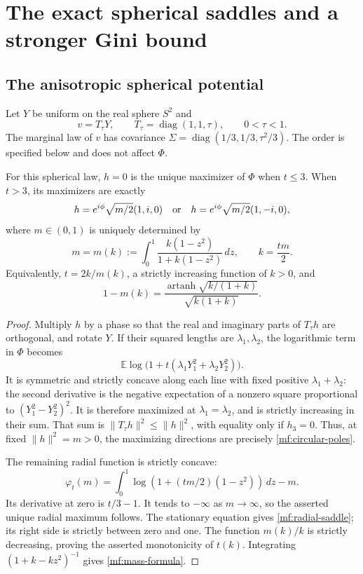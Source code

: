 \section{The exact spherical saddles and a stronger Gini bound}\label{mf:sphere}

\subsection{The anisotropic spherical potential}

Let \(Y\) be uniform on the real sphere \(S^2\) and
\[
 v=T_\tau Y,\qquad T_\tau=\operatorname{diag}(1,1,\tau),
 \qquad 0<\tau<1.
\]
The marginal law of \(v\) has covariance
\(\Sigma=\operatorname{diag}(1/3,1/3,\tau^2/3)\).
The order is specified below and does not affect \(\Phi\).

\begin{proposition}\label{mf:spherical-saddles}
For this spherical law, \(h=0\) is the unique maximizer of \(\Phi\)
when \(t\le3\). When \(t>3\), its maximizers are exactly
\begin{equation}\label{mf:circular-poles}
 h=e^{i\phi}\sqrt{m/2}(1,i,0)
 \quad\hbox{or}\quad
 h=e^{i\phi}\sqrt{m/2}(1,-i,0),
\end{equation}
where \(m\in(0,1)\) is uniquely determined by
\begin{equation}\label{mf:radial-saddle}
 m=m(k):=\int_0^1\frac{k(1-z^2)}{1+k(1-z^2)}\,dz,\qquad
 k=\frac{tm}{2}.
\end{equation}
Equivalently, \(t=2k/m(k)\), a strictly increasing function of \(k>0\),
and
\begin{equation}\label{mf:mass-formula}
 1-m(k)=
 \frac{\operatorname{artanh}\sqrt{k/(1+k)}}{\sqrt{k(1+k)}}.
\end{equation}
\end{proposition}
\begin{proof}
Multiply \(h\) by a phase so that the real and imaginary parts of
\(T_\tau h\) are orthogonal, and rotate \(Y\).
If their squared lengths are \(\lambda_1,\lambda_2\), the logarithmic
term in \(\Phi\) becomes
\[
 \mathbb E\log\bigl(1+t(\lambda_1Y_1^2+\lambda_2Y_2^2)\bigr).
\]
It is symmetric and strictly concave along each line with fixed positive
\(\lambda_1+\lambda_2\): the second derivative is the negative
expectation of a nonzero square proportional to
\((Y_1^2-Y_2^2)^2\).
It is therefore maximized at \(\lambda_1=\lambda_2\), and is strictly
increasing in their sum. That sum is
\(\|T_\tau h\|^2\le\|h\|^2\), with equality only if \(h_3=0\).
Thus, at fixed \(\|h\|^2=m>0\), the maximizing directions are precisely
\eqref{mf:circular-poles}.

The remaining radial function is strictly concave:
\[
 \varphi_t(m)=\int_0^1\log(1+(tm/2)(1-z^2))\,dz-m.
\]
Its derivative at zero is \(t/3-1\). It tends to \(-\infty\) as
\(m\to\infty\), so the asserted unique radial maximum follows.
The stationary equation gives \eqref{mf:radial-saddle}; its right side
is strictly between zero and one.
The function \(m(k)/k\) is strictly decreasing, proving the asserted
monotonicity of \(t(k)\). Integrating
 \((1+k-kz^2)^{-1}\) gives \eqref{mf:mass-formula}.
\end{proof}

